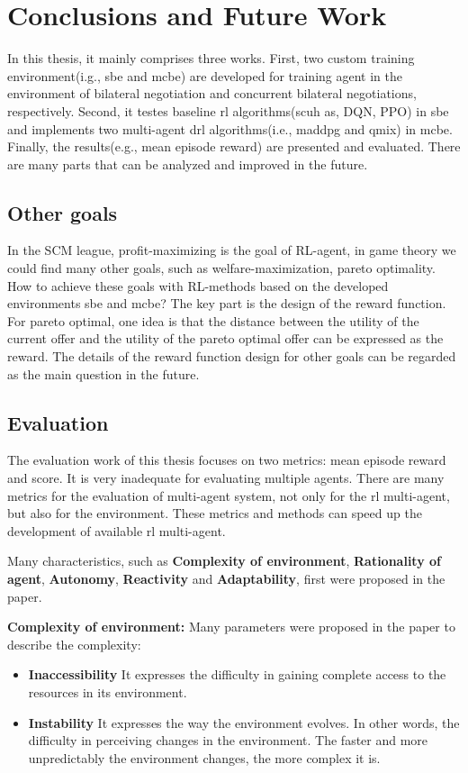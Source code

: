 \chapter{Conclusions and Future Work}
In this thesis, it mainly comprises three works. First, two custom training environment(i.g., \gls{sbe} and \gls{mcbe}) are developed for  training agent in the environment of bilateral negotiation and concurrent bilateral negotiations, respectively. Second, it testes baseline \gls{rl} algorithms(scuh as, DQN, PPO) in \gls{sbe} and implements two multi-agent drl algorithms(i.e., maddpg and qmix) in \gls{mcbe}. Finally, the results(e.g., mean episode reward) are presented and evaluated. There are many parts that can be analyzed and improved in the future.

\section{Other goals}
In the SCM league, profit-maximizing is the goal of RL-agent, in game theory we could find many other goals, such as welfare-maximization, pareto optimality. How to achieve these goals with RL-methods based on the developed environments \gls{sbe} and \gls{mcbe}? The key part is the design of the reward function. For pareto optimal, one idea is that the distance between the utility of the current offer and the utility of the pareto optimal offer can be expressed as the reward. The details of the reward function design for other goals can be regarded as the main question in the future.

\section{Evaluation}
The evaluation work of this thesis focuses on two metrics: mean episode reward and score. It is very inadequate for evaluating multiple agents. There are many metrics for the evaluation of multi-agent system, not only for the \gls{rl} multi-agent, but also for the environment. These metrics and methods can speed up the development of available \gls{rl} multi-agent. 

Many characteristics, such as \textbf{Complexity of environment}, \textbf{Rationality of agent}, \textbf{Autonomy}, \textbf{Reactivity} and \textbf{Adaptability}, first were proposed in the paper\parencite{Bitonto2010}.

\textbf{Complexity of environment:} Many parameters were proposed in the paper to describe the complexity:
\begin{itemize}
\item \textbf{Inaccessibility} It expresses the difficulty in gaining complete access to the resources in its environment.
\item \textbf{Instability} It expresses the way the environment evolves. In other words, the difficulty in perceiving changes in the environment. The faster and more unpredictably the environment changes, the more complex it is.
\end{itemize}

